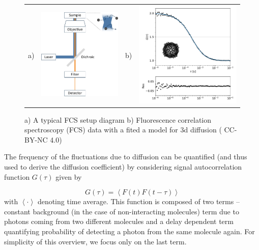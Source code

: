 \documentclass{doctoral}
\begin{document}
\begin{figure}[h]
    \centering
    \begin{tabular}{llll}
        a)                                                                           &
        \includegraphics[height=0.4\linewidth,valign=t]{figures/fcs_setup_clean.pdf} &
        b)                                                                           &
        \includegraphics[height=0.4\linewidth,valign=t,trim=0 0 0 0.5cm]{figures/fcs_data_and_fit.pdf}
    \end{tabular}

    \caption{a) A typical FCS setup diagram  b) Fluorescence correlation spectroscopy (FCS) data with a fited a model for 3d diffusion (\textcite{Waszkiewicz_2024_mda}
        CC-BY-NC 4.0)} \label{fig:fcs_diagram}
\end{figure}

The frequency of the fluctuations due to diffusion can be quantified (and thus used to derive the diffusion coefficient) by considering signal autocorrelation function $G(\tau)$ given by 

\begin{equation}
    G(\tau) = \left< F(t) F(t-\tau) \right>
\end{equation}
with $\left< \cdot \right>$ denoting time average.
This function is composed of two terms -- constant background (in the case of non-interacting molecules) term due to photons coming from two different molecules and a delay dependent term quantifying probability of detecting a photon from the same molecule again.
For simplicity of this overview, we focus only on the last term.
\end{document}

